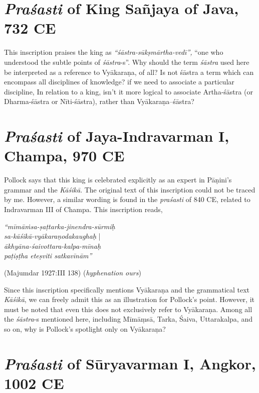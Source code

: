 \section{{\sl\bfseries Praśasti} of King Sañjaya of Java, 732 CE}\label{chap3-sec4}

This inscription praises the king as {\sl ``śāstra-sūkṣmārtha-vedī'',} ``one who understood the subtle points of {\sl śāstra}-s''. Why should the term {\sl śāstra} used here be interpreted as a reference to Vyākaraṇa, of all? Is not śāstra a term which can encompass all disciplines of knowledge? if we need to associate a particular discipline, In relation to a king, isn't it more logical to associate Artha-śāstra (or Dharma-śāstra or Nīti-śāstra), rather than Vyākaraṇa--śāstra?

\section{{\sl\bfseries Praśasti} of Jaya-Indravarman I, Champa, 970 CE}\label{chap3-sec5}

Pollock says that this king is celebrated explicitly as an expert in Pāṇini's grammar and the {\sl Kāśikā}.  The original text of this inscription could not be traced by me. However, a similar wording is found in the {\sl praśasti} of 840 CE, related to Indravarman III of Champa. This inscription reads, 
\begin{myquote}
{{\sl ``mīmāṁsa-ṣaṭtarka-jinendra-sūrmiḥ}}\\
{{\sl sa-kāśikā-vyākaraṇodakaughaḥ}} |\\
{{\sl ākhyāna-śaivottara-kalpa-mīnaḥ}}\\
{{\sl paṭiṣṭha eteṣviti satkavīnām''}}

\hfill (Majumdar 1927:III 138) ({\sl hyphenation ours})
\end{myquote}

Since this inscription specifically mentions Vyākaraṇa and the grammatical text {\sl Kāśikā},  we can freely admit this as an illustration for Pollock's point. However, it must be noted that even this does not exclusively refer to Vyākaraṇa. Among all the {\sl śāstra}-s mentioned here, including Mīmāṃsā, Tarka, Śaiva, Uttarakalpa, and so on, why is Pollock's spotlight only on Vyākaraṇa?

\section{{\sl\bfseries Praśasti} of Sūryavarman I, Angkor, 1002 CE}\label{chap3-sec6}

